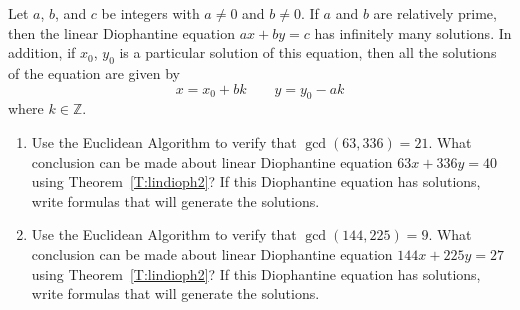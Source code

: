 \begin{corollary} \label{C:lindioph2}
Let $a$, $b$, and $c$ be integers with $a \ne 0$ and $b \ne 0$.  If $a$ and $b$ are relatively prime, then the linear Diophantine equation $ax + by = c$ has infinitely many solutions.  In addition, if  $x_0$, $y_0$ is a particular solution of this equation, then all the solutions of the equation are given by
\[
x = x_0 + b k  \qquad y = y_0 - a k
\]
where $k \in \mathbb{Z}$. 
\end{corollary}
\hbreak
%
\begin{prog}  \label{prog:lindiophequations} \hfill
\begin{enumerate}
\item Use the Euclidean Algorithm to verify that $\gcd ({63, 336} ) = 21$.  What conclusion can be made about linear Diophantine equation $63x + 336y = 40$ using 
Theorem~\ref{T:lindioph2}?  If this Diophantine equation has solutions, write formulas that will generate the solutions.

\item Use the Euclidean Algorithm to verify that $\gcd( {144, 225} ) = 9$.  What conclusion can be made about linear Diophantine equation $144x + 225y = 27$ using 
Theorem~\ref{T:lindioph2}?  If this Diophantine equation has solutions, write formulas that will generate the solutions.
\end{enumerate}
\end{prog}
%
%
\hbreak
%
%
